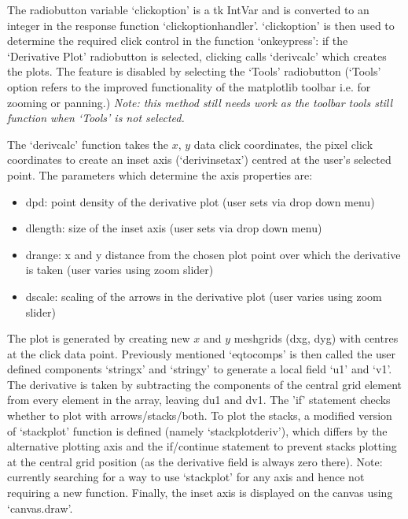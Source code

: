 \documentclass[11]{report}
\begin{document}
The radiobutton variable `click\textunderscore option' is a tk IntVar and is converted to an integer in the response function `click\textunderscore option\textunderscore handler'. `click\textunderscore option' is then used to determine the required click control in the function `on\textunderscore key\textunderscore press': if the `Derivative Plot' radiobutton is selected, clicking calls `deriv\textunderscore calc' which creates the plots. The feature is disabled by selecting the `Tools' radiobutton (`Tools' option refers to the improved functionality of the matplotlib toolbar i.e. for zooming or panning.) \textit{Note: this method still needs work as the toolbar tools still function when `Tools' is not selected.}

The `deriv\textunderscore calc' function takes the $x$, $y$ data click coordinates, the pixel click coordinates to create an inset axis (`deriv\textunderscore inset\textunderscore ax') centred at the user's selected point. The parameters which determine the axis properties are:
\begin{itemize}
	\item dpd: point density of the derivative plot (user sets via drop down menu)
	\item d\textunderscore length: size of the inset axis (user sets via drop down menu)
	\item d\textunderscore range: x and y distance from the chosen plot point over which the derivative is taken (user varies using zoom slider)
	\item d\textunderscore scale: scaling of the arrows in the derivative plot (user varies using zoom slider)
\end{itemize}

The plot is generated by creating new $x$ and $y$ meshgrids (dxg, dyg) with centres at the click data point. Previously mentioned `eq\textunderscore to\textunderscore comps' is then called the user defined components `string\textunderscore x' and `string\textunderscore y' to generate a local field `u1' and `v1'. The derivative is taken by subtracting the components of the central grid element from every element in the array, leaving du1 and dv1. The 'if' statement checks whether to plot with arrows/stacks/both. To plot the stacks, a modified version of `stack\textunderscore plot' function is defined (namely `stack\textunderscore plot\textunderscore deriv'), which differs by the alternative plotting axis and the if/continue statement to prevent stacks plotting at the central grid position (as the derivative field is always zero there). Note: currently searching for a way to use `stack\textunderscore plot' for any axis and hence not requiring a new function. Finally, the inset axis is displayed on the canvas using `canvas.draw'. 
\end{document}
